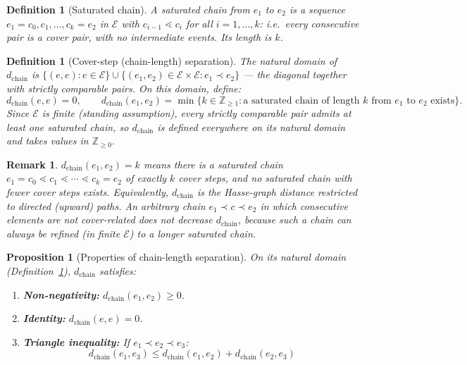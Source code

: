 \documentclass[12pt]{article}
\newtheorem{proposition}[theorem]{Proposition}
\newtheorem{definition}[theorem]{Definition}
\newtheorem{remark}[theorem]{Remark}
\newcommand{\Ecal}{\mathcal{E}}
\begin{document}
\begin{definition}[Saturated chain]\label{def:satchain}
A \textit{saturated chain} from $e_1$ to $e_2$ is a sequence $e_1 = c_0, c_1, \ldots, c_k = e_2$ in $\Ecal$ with $c_{i-1} \lessdot c_i$ for all $i = 1, \ldots, k$: i.e.\ every consecutive pair is a cover pair, with no intermediate events. Its \textit{length} is $k$.
\end{definition}

\begin{definition}[Cover-step (chain-length) separation]\label{def:dchain}
The \textit{natural domain} of $d_{\mathrm{chain}}$ is $\{(e,e) : e \in \Ecal\} \cup \{(e_1, e_2) \in \Ecal \times \Ecal : e_1 \prec e_2\}$ --- the diagonal together with strictly comparable pairs. On this domain, define:
\begin{equation}\label{eq:dchain}
    d_{\mathrm{chain}}(e, e) = 0, \qquad d_{\mathrm{chain}}(e_1, e_2) = \min\{k \in \mathbb{Z}_{\geq 1} : \text{a saturated chain of length } k \text{ from } e_1 \text{ to } e_2 \text{ exists}\}.
\end{equation}
Since $\Ecal$ is finite (standing assumption), every strictly comparable pair admits at least one saturated chain, so $d_{\mathrm{chain}}$ is defined everywhere on its natural domain and takes values in $\mathbb{Z}_{\geq 0}$.
\end{definition}

\begin{remark}
$d_{\mathrm{chain}}(e_1, e_2) = k$ means there is a saturated chain $e_1 = c_0 \lessdot c_1 \lessdot \cdots \lessdot c_k = e_2$ of exactly $k$ cover steps, and no saturated chain with fewer cover steps exists. Equivalently, $d_{\mathrm{chain}}$ is the \textit{Hasse-graph distance restricted to directed (upward) paths}. An arbitrary chain $e_1 \prec c \prec e_2$ in which consecutive elements are not cover-related does \emph{not} decrease $d_{\mathrm{chain}}$, because such a chain can always be refined (in finite $\Ecal$) to a longer saturated chain.
\end{remark}

\begin{proposition}[Properties of chain-length separation]\label{prop:dchain}
On its natural domain (Definition~\ref{def:dchain}), $d_{\mathrm{chain}}$ satisfies:
\begin{enumerate}
    \item \textbf{Non-negativity:} $d_{\mathrm{chain}}(e_1, e_2) \geq 0$.
    \item \textbf{Identity:} $d_{\mathrm{chain}}(e, e) = 0$.
    \item \textbf{Triangle inequality:} If $e_1 \prec e_2 \prec e_3$:
    \begin{equation}
        d_{\mathrm{chain}}(e_1, e_3) \leq d_{\mathrm{chain}}(e_1, e_2) + d_{\mathrm{chain}}(e_2, e_3)
    \end{equation}
\end{enumerate}
\end{proposition}
\end{document}
